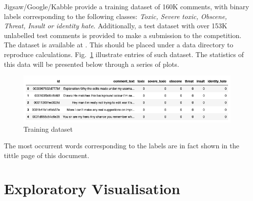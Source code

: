 \documentclass{report}
\begin{document}
 Jigsaw/Google/Kabble provide a training dataset  of 160K comments, with binary labels
 corresponding to the following classes:
 \emph{Toxic, Severe toxic, Obscene, Threat, Insult or  identity hate}.
 Additionally, a test dataset  with over 153K unlabelled  test comments is provided to make 
 a submission to the competition. The dataset is available at \cite{Kaggle}. This should be placed under a data
 directory to reproduce calculations. Fig.~\ref{fig:train_head} illustrate entries of 
 such dataset. The statistics of this data will be presented below through a series of plots. 
\begin{figure}[!h]
\centering
  \includegraphics[width=140mm]{../local/plots_tables/train_head.png}
  \caption{Training dataset}
  \label{fig:train_head}
\end{figure}
The most occurrent words corresponding to the labels are in fact shown in the tittle page of this document.


\section{Exploratory Visualisation}
\end{document}
